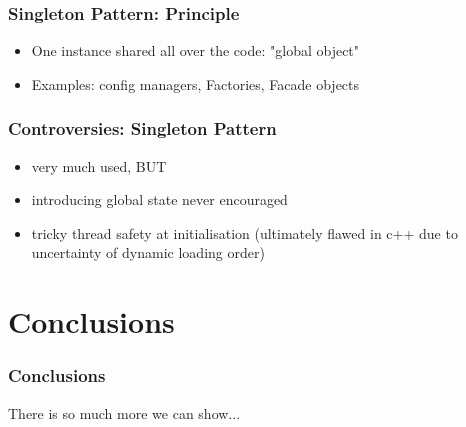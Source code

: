 \documentclass{beamer}
\begin{document}
\begin{frame}
\frametitle{Singleton Pattern: Principle}
\begin{itemize}
 \item One instance shared all over the code: "global object"
 \item Examples: config managers, Factories, Facade objects
\end{itemize}
\end{frame} 

\begin{frame}
\frametitle{Controversies: Singleton Pattern}
\begin{itemize}
 \item very much used, BUT
 \item introducing global state never encouraged
 \item tricky thread safety at initialisation (ultimately flawed in c++ due to uncertainty of dynamic loading order)
\end{itemize}
\end{frame} 





\section{Conclusions}
\begin{frame}
\frametitle{Conclusions}


There is so much more we can show...
 
\end{frame}

\end{document}
